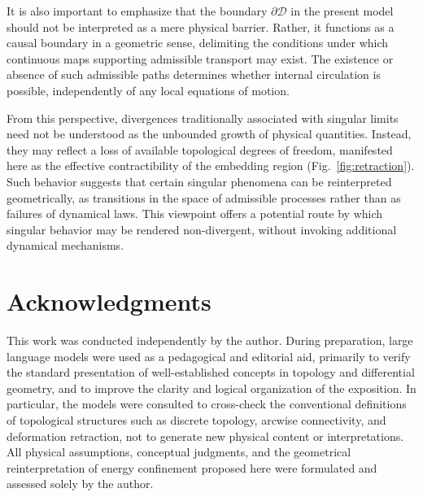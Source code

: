 \documentclass[%
 reprint,
 amsmath,amssymb,
 aps,
 prb,
]{revtex4-2}
\numberwithin{equation}{section}
\begin{document}
It is also important to emphasize that the boundary $\partial \mathcal{D}$ in the present model should not be interpreted as a mere physical barrier.
Rather, it functions as a causal boundary in a geometric sense, delimiting the conditions under which continuous maps supporting admissible transport may exist.
The existence or absence of such admissible paths determines whether internal circulation is possible, independently of any local equations of motion.

From this perspective, divergences traditionally associated with singular limits need not be understood as the unbounded growth of physical quantities.
Instead, they may reflect a loss of available topological degrees of freedom, manifested here as the effective contractibility of the embedding region (Fig.~\ref{fig:retraction}).
Such behavior suggests that certain singular phenomena can be reinterpreted geometrically, as transitions in the space of admissible processes rather than as failures of dynamical laws.
This viewpoint offers a potential route by which singular behavior may be rendered non-divergent, without invoking additional dynamical mechanisms.

\clearpage

\section*{Acknowledgments}
This work was conducted independently by the author. During preparation, large language models were used as a pedagogical and editorial aid, primarily to verify the standard presentation of well-established concepts in topology and differential geometry, and to improve the clarity and logical organization of the exposition. 
In particular, the models were consulted to cross-check the conventional definitions of topological structures such as discrete topology, arcwise connectivity, and deformation retraction, not to generate new physical content or interpretations. All physical assumptions, conceptual judgments, and the geometrical reinterpretation of energy confinement proposed here were formulated and assessed solely by the author.
\end{document}
